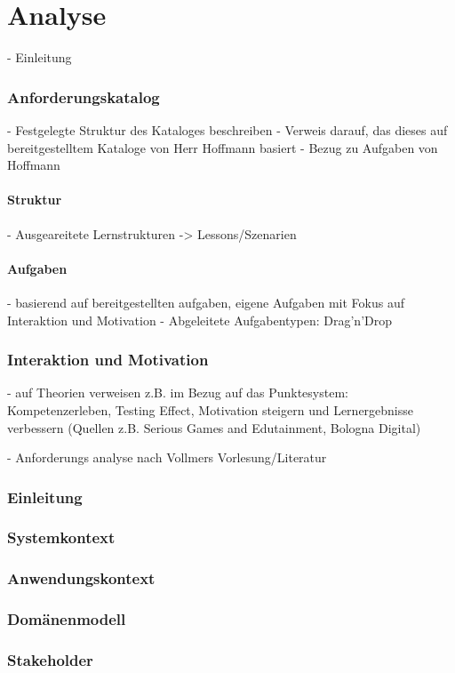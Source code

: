 \chapter{Analyse}

- Einleitung 
\subsection{Anforderungskatalog}
- Festgelegte Struktur des Kataloges beschreiben
- Verweis darauf, das dieses auf bereitgestelltem Kataloge von Herr Hoffmann basiert
- Bezug zu Aufgaben von Hoffmann

\subsubsection{Struktur} 
- Ausgeareitete Lernstrukturen -> Lessons/Szenarien
\subsubsection{Aufgaben}
- basierend auf bereitgestellten aufgaben, eigene Aufgaben mit Fokus auf Interaktion und Motivation
- Abgeleitete Aufgabentypen: Drag'n'Drop

\subsection{Interaktion und Motivation}
- auf Theorien verweisen z.B. im Bezug auf das Punktesystem: Kompetenzerleben, Testing Effect, Motivation steigern und Lernergebnisse verbessern (Quellen z.B. Serious Games and Edutainment, Bologna Digital)

- Anforderungs analyse nach Vollmers Vorlesung/Literatur
\subsection{Einleitung}
\subsection{Systemkontext}
\subsection{Anwendungskontext}
\subsection{Domänenmodell}
\subsection{Stakeholder}

